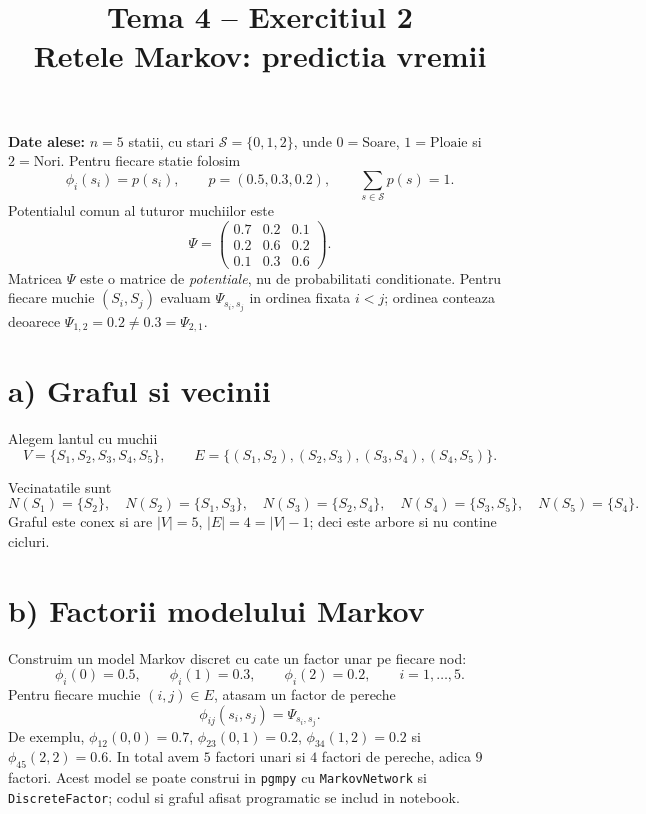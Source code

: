 \documentclass[11pt,a4paper]{article}
\title{Tema 4 -- Exercitiul 2\\Retele Markov: predictia vremii}
\author{}
\date{}
\begin{document}
\maketitle
\textbf{Date alese:} $n=5$ statii, cu stari $\mathcal S=\{0,1,2\}$, unde $0=\mathrm{Soare}$, $1=\mathrm{Ploaie}$ si $2=\mathrm{Nori}$. Pentru fiecare statie folosim
\[
\phi_i(s_i)=p(s_i),\qquad p=(0.5,0.3,0.2),\qquad \sum_{s\in\mathcal S}p(s)=1.
\]
Potentialul comun al tuturor muchiilor este
\[
\Psi=\begin{pmatrix}0.7&0.2&0.1\\0.2&0.6&0.2\\0.1&0.3&0.6\end{pmatrix}.
\]
Matricea $\Psi$ este o matrice de \emph{potentiale}, nu de probabilitati conditionate. Pentru fiecare muchie $(S_i,S_j)$ evaluam $\Psi_{s_i,s_j}$ in ordinea fixata $i<j$; ordinea conteaza deoarece $\Psi_{1,2}=0.2\ne0.3=\Psi_{2,1}$.

\section*{a) Graful si vecinii}
Alegem lantul cu muchii
\[
V=\{S_1,S_2,S_3,S_4,S_5\},\qquad
E=\{(S_1,S_2),(S_2,S_3),(S_3,S_4),(S_4,S_5)\}.
\]
\begin{center}
\end{center}
Vecinatatile sunt
\[
N(S_1)=\{S_2\},\quad N(S_2)=\{S_1,S_3\},\quad
N(S_3)=\{S_2,S_4\},\quad N(S_4)=\{S_3,S_5\},\quad N(S_5)=\{S_4\}.
\]
Graful este conex si are $|V|=5$, $|E|=4=|V|-1$; deci este arbore si nu contine cicluri.

\section*{b) Factorii modelului Markov}
Construim un model Markov discret cu cate un factor unar pe fiecare nod:
\[
\phi_i(0)=0.5,\qquad \phi_i(1)=0.3,\qquad \phi_i(2)=0.2,\qquad i=1,\dots,5.
\]
Pentru fiecare muchie $(i,j)\in E$, atasam un factor de pereche
\[
\phi_{ij}(s_i,s_j)=\Psi_{s_i,s_j}.
\]
De exemplu, $\phi_{12}(0,0)=0.7$, $\phi_{23}(0,1)=0.2$, $\phi_{34}(1,2)=0.2$ si $\phi_{45}(2,2)=0.6$. In total avem $5$ factori unari si $4$ factori de pereche, adica $9$ factori. Acest model se poate construi in \texttt{pgmpy} cu \texttt{MarkovNetwork} si \texttt{DiscreteFactor}; codul si graful afisat programatic se includ in notebook.
\end{document}
